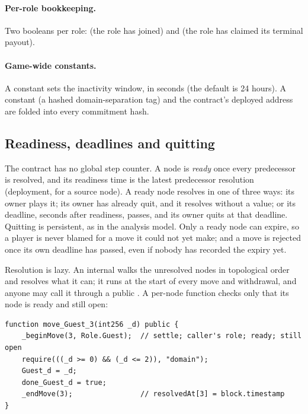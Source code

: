 \paragraph{Per-role bookkeeping.}  Two booleans per role:
 (the role has joined) and
 (the role has claimed its terminal
payout).

\paragraph{Game-wide constants.}  A constant  sets the
inactivity window, in seconds (the default is 24 hours).  A
constant  (a hashed domain-separation tag) and the
contract's deployed address are folded into every commitment hash.

\subsection{Readiness, deadlines and quitting}
\label{sec:solidity:depends}

The contract has no global step counter.  A node is \emph{ready}
once every predecessor is resolved, and its readiness time is the
latest predecessor resolution (deployment, for a source node).  A
ready node resolves in one of three ways: its owner plays it; its
owner has already quit, and it resolves without a value; or its
deadline,  seconds after readiness, passes, and its owner
quits at that deadline.  Quitting is persistent, as in the analysis
model.  Only a ready node can expire, so a player is never blamed for
a move it could not yet make; and a move is rejected once its own
deadline has passed, even if nobody has recorded the expiry yet.

Resolution is lazy.  An internal  walks the unresolved
nodes in topological order and resolves what it can; it runs at the
start of every move and withdrawal, and anyone may call it through a
public .  A per-node function checks only that its node
is ready and still open:

\begin{lstlisting}[style=sol]
function move_Guest_3(int256 _d) public {
    _beginMove(3, Role.Guest);  // settle; caller's role; ready; still open
    require(((_d >= 0) && (_d <= 2)), "domain");
    Guest_d = _d;
    done_Guest_d = true;
    _endMove(3);                // resolvedAt[3] = block.timestamp
}
\end{lstlisting}

